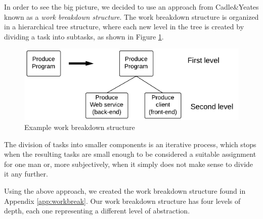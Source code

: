 In order to see the big picture, we decided to use an approach from Cadle\&Yeates\cite[ch.~8.3.1]{caye} known as a \emph{work breakdown structure}. The work breakdown structure is organized in a hierarchical tree structure, where each new level in the tree is created by dividing a task into subtasks, as shown in Figure \ref{fig:breakdown}.

\begin{figure}[hbtp]
    \centering
	\includegraphics[scale=0.25]{./Empiri/Planning/img/wbslevels.png}
	\caption{Example work breakdown structure} \label{fig:breakdown}
\end{figure}

The division of tasks into smaller components is an iterative process, which stops when the resulting tasks are small enough to be considered a suitable assignment for one man or, more subjectively, when it simply does not make sense to divide it any further.

Using the above approach, we created the work breakdown structure found in Appendix \ref{app:workbreak}. Our work breakdown structure has four levels of depth, each one representing a different level of abstraction.